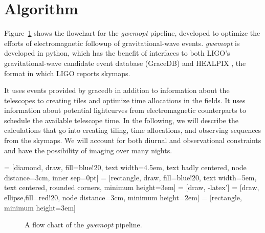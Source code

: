 \documentclass[twocolumn]{aastex61}
\begin{document}
\section{Algorithm}
\label{sec:algorithm}

Figure~\ref{fig:flowchart} shows the flowchart for the \emph{gwemopt} pipeline, developed to optimize the efforts of electromagnetic followup of gravitational-wave events. \emph{gwemopt} is developed in python, which has the benefit of interfaces to both LIGO's gravitational-wave candidate event database (GraceDB) and HEALPIX \cite{GoHi2005}, the format in which LIGO reports skymaps.

It uses events provided by gracedb in addition to information about the telescopes to creating tiles and optimize time allocations in the fields.
It uses information about potential lightcurves from electromagnetic counterparts to schedule the available telescope time.
In the following, we will describe the calculations that go into creating tiling, time allocations, and observing sequences from the skymaps.
We will account for both diurnal and observational constraints and have the possibility of imaging over many nights.

 = [diamond, draw, fill=blue!20,
    text width=4.5em, text badly centered, node distance=3cm, inner sep=0pt]
 = [rectangle, draw, fill=blue!20,
    text width=5em, text centered, rounded corners, minimum height=3em]
 = [draw, -latex']
 = [draw, ellipse,fill=red!20, node distance=3cm,
    minimum height=2em]
 = [rectangle, minimum height=3em]

\begin{figure}[t]
 \begin{center}
 \end{center}
 \caption{A flow chart of the \emph{gwemopt} pipeline.}
 \label{fig:flowchart}
\end{figure}
\end{document}
